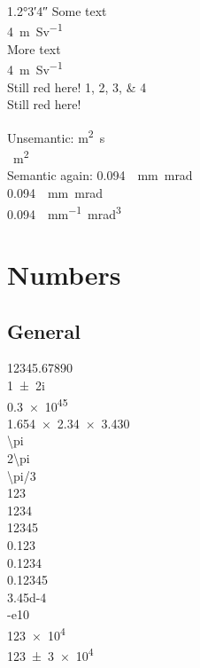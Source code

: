 \documentclass{article}
\begin{document}
\ang{1.2;3;4}
{
\color{red}
Some text \\
\SI{4}{\metre\per\sievert} \\
More text \\
\SI[color = blue]{4}{\metre\per\sievert} \\
Still red here!
\numlist[color = blue]{1;2;3;4}\\
Still red here!\\
}

Unsemantic:
\si{m^2.s}\\
\si{\mu m^2}\\

Semantic again:
\SI{0.094}{\pi . \milli\meter . \milli\radian}\\

\SI{0.094}{ . \milli\meter . \milli\radian}\\

\SI{0.094}{\pi \per \milli\meter . \milli\radian\tothe{3}}\\
\section{Numbers}
\subsection{General}
\num{12345,67890}\\
\num{1+-2i}\\
\num{.3e45}\\
\num{1.654 x 2.34 x 3.430}\\
\num{\pi}\\
\num{2\pi}\\
\num{\pi/3}\\

\num{123}\\
\num{1234}\\
\num{12345}\\
\num{0.123}\\
\num{0,1234}\\
\num{.12345}\\
\num{3.45d-4}\\
\num{-e10}\\

\num{123e4}\\
\num{123(3)e4}\\
\end{document}
